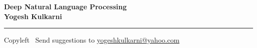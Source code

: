 
\graphicspath{{images/}}

\footnotesize


\begin{center}
\Large{\textbf{Deep Natural Language Processing\\ Yogesh Kulkarni}}  
\end{center}

\begin{multicols}{2}
% 

\end{multicols}

\rule{\linewidth}{0.25pt}
\scriptsize
Copyleft \textcopyleft\  Send suggestions to 
\href{http://yati.io}{yogeshkulkarni@yahoo.com}



